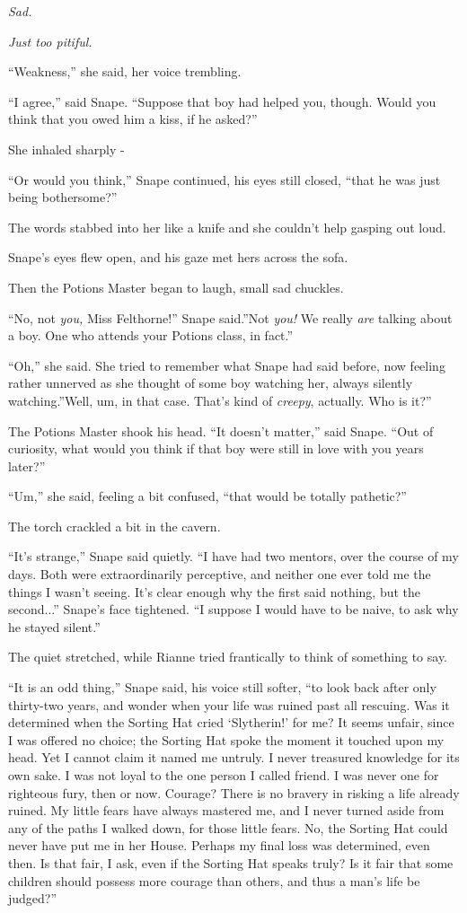 \emph{Sad.}

\emph{Just too p}\emph{itiful.}

``Weakness,'' she said, her voice trembling.

``I agree,'' said Snape. ``Suppose that boy had helped you, though.
Would you think that you owed him a kiss, if he asked?''

She inhaled sharply -

``Or would you think,'' Snape continued, his eyes still closed, ``that
he was just being bothersome?''

The words stabbed into her like a knife and she couldn't help gasping
out loud.

Snape's eyes flew open, and his gaze met hers across the sofa.

Then the Potions Master began to laugh, small sad chuckles.

``No, not \emph{you,} Miss Felthorne!'' Snape said.''Not \emph{you!} We
really \emph{are} talking about a boy. One who attends your Potions
class, in fact.''

``Oh,'' she said. She tried to remember what Snape had said before, now
feeling rather unnerved as she thought of some boy watching her, always
silently watching.''Well, um, in that case. That's kind of
\emph{creepy}, actually. Who is it?''

The Potions Master shook his head. ``It doesn't matter,'' said Snape.
``Out of curiosity, what would you think if that boy were still in love
with you years later?''

``Um,'' she said, feeling a bit confused, ``that would be totally
pathetic?''

The torch crackled a bit in the cavern.

``It's strange,'' Snape said quietly. ``I have had two mentors, over the
course of my days. Both were extraordinarily perceptive, and neither one
ever told me the things I wasn't seeing. It's clear enough why the first
said nothing, but the second...'' Snape's face tightened. ``I
suppose I would have to be naive, to ask why he stayed silent.''

The quiet stretched, while Rianne tried frantically to think of
something to say.

``It is an odd thing,'' Snape said, his voice still softer, ``to look
back after only thirty-two years, and wonder when your life was ruined
past all rescuing. Was it determined when the Sorting Hat cried
`Slytherin!' for me? It seems unfair, since I was offered no choice; the
Sorting Hat spoke the moment it touched upon my head. Yet I cannot claim
it named me untruly. I never treasured knowledge for its own sake. I was
not loyal to the one person I called friend. I was never one for
righteous fury, then or now. Courage? There is no bravery in risking a
life already ruined. My little fears have always mastered me, and I
never turned aside from any of the paths I walked down, for those little
fears. No, the Sorting Hat could never have put me in her House. Perhaps
my final loss was determined, even then. Is that fair, I ask, even if
the Sorting Hat speaks truly? Is it fair that some children should
possess more courage than others, and thus a man's life be judged?''

